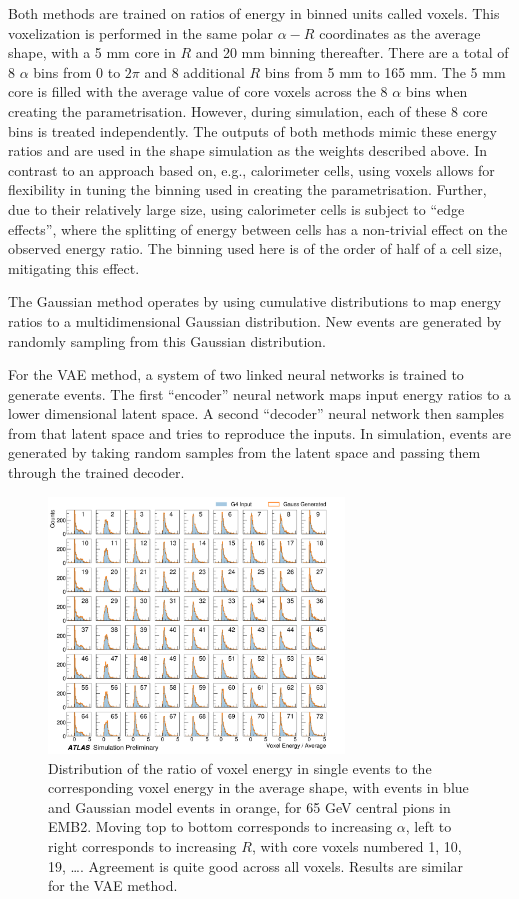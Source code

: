 Both methods are trained on ratios of energy in binned units called voxels. This voxelization is performed in the same polar 
$\alpha-R$ coordinates as the average shape, with a 5 mm core in $R$ and 20 mm binning thereafter. There are a total of 8 
$\alpha$ bins from 0 to $2\pi$ and 8 additional $R$ bins from 5 mm to 165 mm. The 5 mm core is filled with the average value 
of core voxels across the 8 $\alpha$ bins when creating the parametrisation. However, during simulation, each of these 8 core 
bins is treated independently. The outputs of both methods mimic these energy ratios and are used in the shape simulation as 
the weights described above. In contrast to an approach based on, e.g., calorimeter cells, using voxels allows for 
flexibility in tuning the binning used in creating the parametrisation. Further, due to their relatively large size, using 
calorimeter cells is subject to ``edge effects'', where the splitting of energy between cells has a non-trivial effect on the 
observed energy ratio. The binning used here is of the order of half of a cell size, mitigating this effect.

The Gaussian method operates by using cumulative distributions to map \GEANT energy ratios to a multidimensional Gaussian 
distribution. New events are generated by randomly sampling from this Gaussian distribution.

For the VAE method, a system of two linked neural networks is trained to generate events. The first ``encoder'' neural 
network maps input \GEANT energy ratios to a lower dimensional latent space. A second ``decoder'' neural network then samples 
from that latent space and tries to reproduce the inputs. In simulation, events are generated by taking random samples from 
the latent space and passing them through the trained decoder.

\begin{figure}[ht!]
\centering
\includegraphics[width=0.7\textwidth]{figures/FCS-fig-02.pdf}
\caption{Distribution of the ratio of voxel energy in single events to the corresponding voxel energy in the average shape, with \GEANT events in blue and Gaussian model events in orange, for 65 GeV central pions in EMB2. Moving top to bottom corresponds to increasing $\alpha$, left to right corresponds to increasing $R$, with core voxels numbered 1, 10, 19, \ldots. Agreement is quite good across all voxels. Results are similar for the VAE method.}
\label{fig-3}       %
\end{figure}

